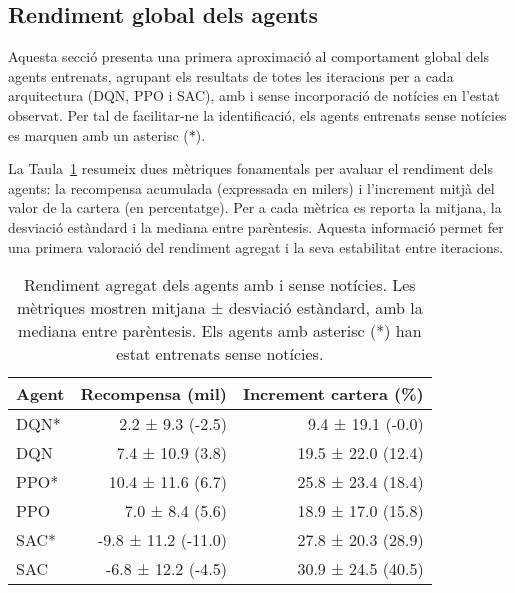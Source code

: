 \documentclass[12pt,a4paper,twoside]{book}
\begin{document}
\subsection{Rendiment global dels agents}

Aquesta secció presenta una primera aproximació al comportament global dels agents entrenats, agrupant els resultats de totes les iteracions per a cada arquitectura (DQN, PPO i SAC), amb i sense incorporació de notícies en l'estat observat. Per tal de facilitar-ne la identificació, els agents entrenats sense notícies es marquen amb un asterisc (*).

La Taula~\ref{tab:resultats-globals} resumeix dues mètriques fonamentals per avaluar el rendiment dels agents: la recompensa acumulada (expressada en milers) i l’increment mitjà del valor de la cartera (en percentatge). Per a cada mètrica es reporta la mitjana, la desviació estàndard i la mediana entre parèntesis. Aquesta informació permet fer una primera valoració del rendiment agregat i la seva estabilitat entre iteracions.

\begin{table}[H]
\centering
\begin{tabular}{lrr}
\toprule
\textbf{Agent} & \textbf{Recompensa (mil)} & \textbf{Increment cartera (\%)} \\
\midrule
DQN*  & 2.2 ± 9.3 \hspace{1mm} (-2.5)   & 9.4 ± 19.1 \hspace{1mm} (-0.0) \\
DQN   & 7.4 ± 10.9 \hspace{1mm} (3.8)   & 19.5 ± 22.0 \hspace{1mm} (12.4) \\
PPO*  & 10.4 ± 11.6 \hspace{1mm} (6.7)  & 25.8 ± 23.4 \hspace{1mm} (18.4) \\
PPO   & 7.0 ± 8.4 \hspace{1mm} (5.6)    & 18.9 ± 17.0 \hspace{1mm} (15.8) \\
SAC*  & -9.8 ± 11.2 \hspace{1mm} (-11.0) & 27.8 ± 20.3 \hspace{1mm} (28.9) \\
SAC   & -6.8 ± 12.2 \hspace{1mm} (-4.5) & 30.9 ± 24.5 \hspace{1mm} (40.5) \\
\bottomrule
\end{tabular}
\caption{Rendiment agregat dels agents amb i sense notícies. Les mètriques mostren mitjana ± desviació estàndard, amb la mediana entre parèntesis. Els agents amb asterisc (*) han estat entrenats sense notícies.}
\label{tab:resultats-globals}
\end{table}
\end{document}
